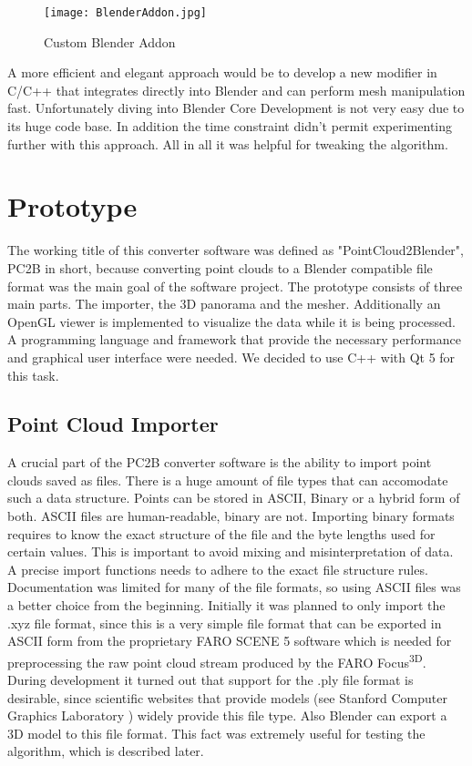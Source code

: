 \begin{figure}[h]
	\centering
	\texttt{[image: BlenderAddon.jpg]}
	\caption{Custom Blender Addon}
	\label{fig:blender_addon}
\end{figure}

A more efficient and elegant approach would be to develop a new modifier in C/C++ that integrates directly into Blender and can perform mesh manipulation fast. Unfortunately diving into Blender Core Development is not very easy due to its huge code base. In addition the time constraint didn't permit experimenting further with this approach. All in all it was helpful for tweaking the algorithm.

\section{Prototype}

The working title of this converter software was defined as "PointCloud2Blender", PC2B in short, because converting point clouds to a Blender compatible file format was the main goal of the software project. The prototype consists of three main parts. The importer, the 3D panorama and the mesher. Additionally an OpenGL viewer is implemented to visualize the data while it is being processed. A programming language and framework that provide the necessary performance and graphical user interface were needed. We decided to use C++ with Qt 5 for this task.

\subsection{Point Cloud Importer}

A crucial part of the PC2B converter software is the ability to import point clouds saved as files. There is a huge amount of file types that can accomodate such a data structure. Points can be stored in ASCII, Binary or a hybrid form of both. ASCII files are human-readable, binary are not. Importing binary formats requires to know the exact structure of the file and the byte lengths used for certain values. This is important to avoid mixing and misinterpretation of data. A precise import functions needs to adhere to the exact file structure rules. Documentation was limited for many of the file formats, so using ASCII files was a better choice from the beginning. Initially it was planned to only import the .xyz file format, since this is a very simple file format that can be exported in ASCII form from the proprietary FARO SCENE 5 software which is needed for preprocessing the raw point cloud stream produced by the FARO Focus\textsuperscript{3D}.\\
During development it turned out that support for the .ply file format is desirable, since scientific websites that provide models (see Stanford Computer Graphics Laboratory \parencite{Stanford_repo}) widely provide this file type. Also Blender can export a 3D model to this file format. This fact was extremely useful for testing the algorithm, which is described later.

